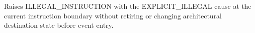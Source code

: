 Raises ILLEGAL\_INSTRUCTION with the EXPLICIT\_ILLEGAL cause at the current instruction boundary without retiring or changing architectural destination state before event entry.
